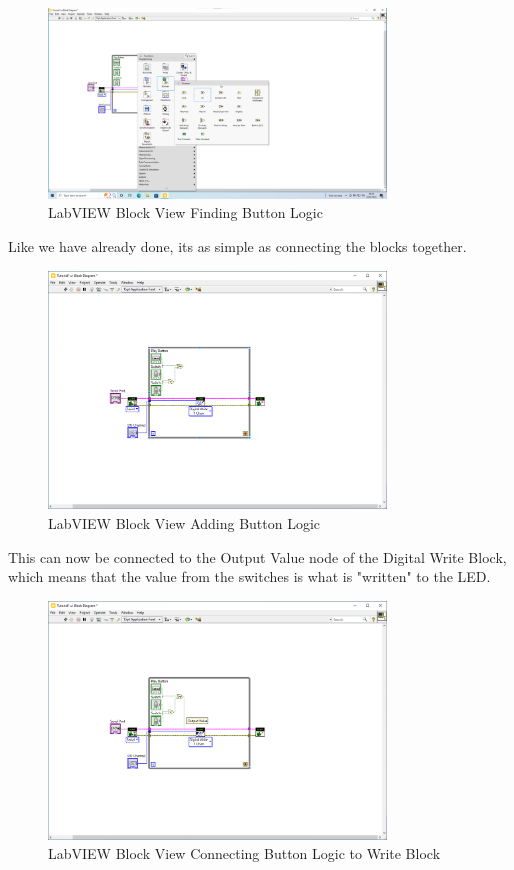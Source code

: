 \documentclass[a4paper,11pt]{report}
\begin{document}
\begin{figure}[H]
\centering
\includegraphics[width=0.8\textwidth]{screenshots/labview24}
\caption{LabVIEW Block View Finding Button Logic}
\end{figure}

Like we have already done, its as simple as connecting the blocks together.

\begin{figure}[H]
\centering
\includegraphics[width=0.8\textwidth]{screenshots/labview25}
\caption{LabVIEW Block View Adding Button Logic}
\end{figure}

This can now be connected to the Output Value node of the Digital Write Block, which means that the value from the switches is what is "written" to the LED.

\begin{figure}[H]
\centering
\includegraphics[width=0.8\textwidth]{screenshots/labview26}
\caption{LabVIEW Block View Connecting Button Logic to Write Block}
\end{figure}
\end{document}
